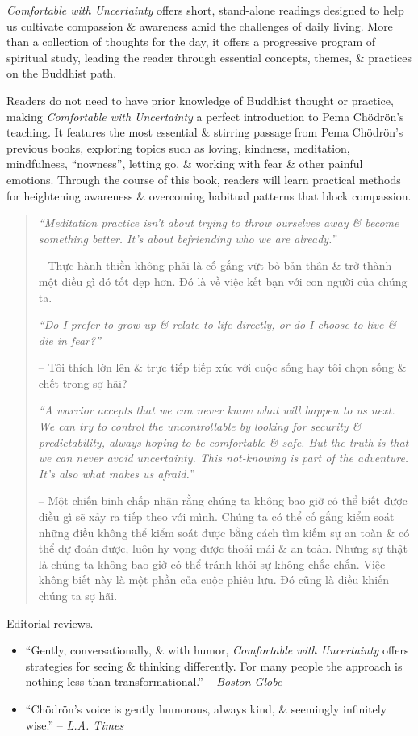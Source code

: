 \documentclass{article}
\begin{document}
\begin{enumerate}
	{\it Comfortable with Uncertainty} offers short, stand-alone readings designed to help us cultivate compassion \& awareness amid the challenges of daily living. More than a collection of thoughts for the day, it offers a progressive program of spiritual study, leading the reader through essential concepts, themes, \& practices on the Buddhist path.
	
	Readers do not need to have prior knowledge of Buddhist thought or practice, making {\it Comfortable with Uncertainty} a perfect introduction to {\sc Pema Ch\"odr\"on}'s teaching. It features the most essential \& stirring passage from {\sc Pema Ch\"odr\"on}'s previous books, exploring topics such as loving, kindness, meditation, mindfulness, ``nowness'', letting go, \& working with fear \& other painful emotions. Through the course of this book, readers will learn practical methods for heightening awareness \& overcoming habitual patterns that block compassion.

	\begin{quotation}
		{\it``Meditation practice isn't about trying to throw ourselves away \& become something better. It's about befriending who we are already.''}
		
		-- Thực hành thiền không phải là cố gắng vứt bỏ bản thân \& trở thành một điều gì đó tốt đẹp hơn. Đó là về việc kết bạn với con người của chúng ta.
		
		{\it``Do I prefer to grow up \& relate to life directly, or do I choose to live \& die in fear?''}
		
		-- Tôi thích lớn lên \& trực tiếp tiếp xúc với cuộc sống hay tôi chọn sống \& chết trong sợ hãi?
		
		{\it``A warrior accepts that we can never know what will happen to us next. We can try to control the uncontrollable by looking for security \& predictability, always hoping to be comfortable \& safe. But the truth is that we can never avoid uncertainty. This not-knowing is part of the adventure. It's also what makes us afraid.''}
		
		-- Một chiến binh chấp nhận rằng chúng ta không bao giờ có thể biết được điều gì sẽ xảy ra tiếp theo với mình. Chúng ta có thể cố gắng kiểm soát những điều không thể kiểm soát được bằng cách tìm kiếm sự an toàn \& có thể dự đoán được, luôn hy vọng được thoải mái \& an toàn. Nhưng sự thật là chúng ta không bao giờ có thể tránh khỏi sự không chắc chắn. Việc không biết này là một phần của cuộc phiêu lưu. Đó cũng là điều khiến chúng ta sợ hãi.
	\end{quotation}
	{\sf Editorial reviews.}
	\begin{itemize}
		\item ``Gently, conversationally, \& with humor, {\it Comfortable with Uncertainty} offers strategies for seeing \& thinking differently. For many people the approach is nothing less than transformational.'' -- {\it Boston Globe}
		\item ``{\sc Ch\"odr\"on}'s voice is gently humorous, always kind, \& seemingly infinitely wise.'' -- {\it L.A. Times}
	\end{itemize}
		

\end{enumerate}
\end{document}
